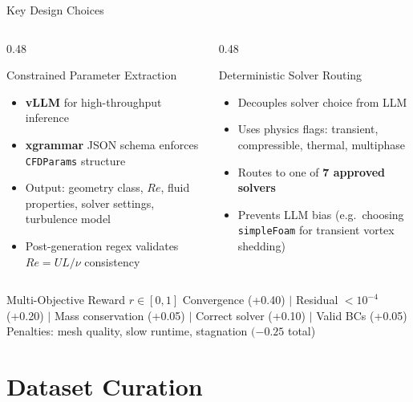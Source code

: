 \documentclass[aspectratio=169,10pt]{beamer}
\begin{document}
\begin{frame}{Key Design Choices}
  \begin{columns}
    \begin{column}{0.48\textwidth}
      \begin{block}{Constrained Parameter Extraction}
        \begin{itemize}
          \item \textbf{vLLM} for high-throughput inference
          \item \textbf{xgrammar} JSON schema enforces \texttt{CFDParams} structure
          \item Output: geometry class, $Re$, fluid properties, solver settings, turbulence model
          \item Post-generation regex validates $Re = UL/\nu$ consistency
        \end{itemize}
      \end{block}
    \end{column}
    \begin{column}{0.48\textwidth}
      \begin{block}{Deterministic Solver Routing}
        \begin{itemize}
          \item Decouples solver choice from LLM
          \item Uses physics flags: transient, compressible, thermal, multiphase
          \item Routes to one of \textbf{7 approved solvers}
          \item Prevents LLM bias (e.g.\ choosing \texttt{simpleFoam} for transient vortex shedding)
        \end{itemize}
      \end{block}
    \end{column}
  \end{columns}
  \vspace{6pt}
  \begin{alertblock}{Multi-Objective Reward $r \in [0,1]$}
    \centering\small
    Convergence (+0.40) $|$ Residual $<10^{-4}$ (+0.20) $|$ Mass conservation (+0.05) $|$ Correct solver (+0.10) $|$ Valid BCs (+0.05)\\
    Penalties: mesh quality, slow runtime, stagnation $(-0.25$ total)
  \end{alertblock}
\end{frame}

\section{Dataset Curation}
\end{document}
